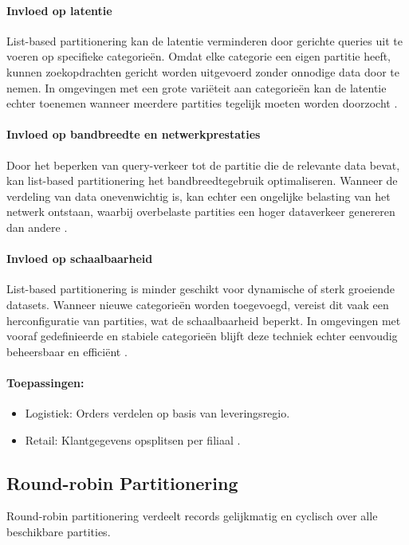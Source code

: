 \paragraph{Invloed op latentie} 
List-based partitionering kan de latentie verminderen door gerichte queries uit te voeren op specifieke categorieën. Omdat elke categorie een eigen partitie heeft, kunnen zoekopdrachten gericht worden uitgevoerd zonder onnodige data door te nemen. In omgevingen met een grote variëteit aan categorieën kan de latentie echter toenemen wanneer meerdere partities tegelijk moeten worden doorzocht \autocite{Ponnusamy2024, Mahmud2020}.
 
\paragraph{Invloed op bandbreedte en netwerkprestaties} 
Door het beperken van query-verkeer tot de partitie die de relevante data bevat, kan list-based partitionering het bandbreedtegebruik optimaliseren. Wanneer de verdeling van data onevenwichtig is, kan echter een ongelijke belasting van het netwerk ontstaan, waarbij overbelaste partities een hoger dataverkeer genereren dan andere \autocite{Mahmud2020}.
 
\paragraph{Invloed op schaalbaarheid} 
List-based partitionering is minder geschikt voor dynamische of sterk groeiende datasets. Wanneer nieuwe categorieën worden toegevoegd, vereist dit vaak een herconfiguratie van partities, wat de schaalbaarheid beperkt. In omgevingen met vooraf gedefinieerde en stabiele categorieën blijft deze techniek echter eenvoudig beheersbaar en efficiënt \autocite{Mahmud2020}.
 
\paragraph{Toepassingen:}
\begin{itemize}
    \item Logistiek: Orders verdelen op basis van leveringsregio.
    \item Retail: Klantgegevens opsplitsen per filiaal \autocite{Ponnusamy2024}.
\end{itemize}
 
\subsection{Round-robin Partitionering}
Round-robin partitionering verdeelt records gelijkmatig en cyclisch over alle beschikbare partities.
 

